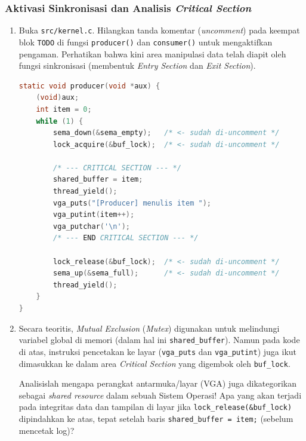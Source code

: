 \subsubsection{Aktivasi Sinkronisasi dan Analisis \textit{Critical Section}}

\begin{enumerate}

	\item Buka \texttt{src/kernel.c}. Hilangkan tanda komentar (\textit{uncomment}) pada keempat blok \texttt{TODO} di fungsi \texttt{producer()} dan \texttt{consumer()} untuk mengaktifkan pengaman.
	      Perhatikan bahwa kini area manipulasi data telah diapit oleh fungsi sinkronisasi (membentuk \textit{Entry Section} dan \textit{Exit Section}).

	      \begin{lstlisting}[language=C, caption={Tampilan \texttt{producer()} setelah hilangkan blok komentar}]
static void producer(void *aux) {
    (void)aux;
    int item = 0;
    while (1) {
        sema_down(&sema_empty);   /* <- sudah di-uncomment */
        lock_acquire(&buf_lock);  /* <- sudah di-uncomment */

        /* --- CRITICAL SECTION --- */
        shared_buffer = item;
        thread_yield();
        vga_puts("[Producer] menulis item ");
        vga_putint(item++);
        vga_putchar('\n');
        /* --- END CRITICAL SECTION --- */

        lock_release(&buf_lock);  /* <- sudah di-uncomment */
        sema_up(&sema_full);      /* <- sudah di-uncomment */
        thread_yield();
    }
}
    \end{lstlisting}

	\item Secara teoritis, \textit{Mutual Exclusion} (\textit{Mutex}) digunakan untuk melindungi variabel global di memori (dalam hal ini \texttt{shared\_buffer}). Namun pada kode di atas,
	      instruksi pencetakan ke layar (\texttt{vga\_puts} dan \texttt{vga\_putint}) juga ikut dimasukkan ke dalam area \textit{Critical Section} yang digembok oleh \texttt{buf\_lock}.

	      Analisislah mengapa perangkat antarmuka/layar (VGA) juga dikategorikan sebagai \textit{shared resource} dalam sebuah Sistem Operasi! Apa yang akan terjadi pada integritas data dan
	      tampilan di layar jika \texttt{lock\_release(\&buf\_lock)} dipindahkan ke atas, tepat setelah baris \texttt{shared\_buffer = item;} (sebelum mencetak log)?

\end{enumerate}

